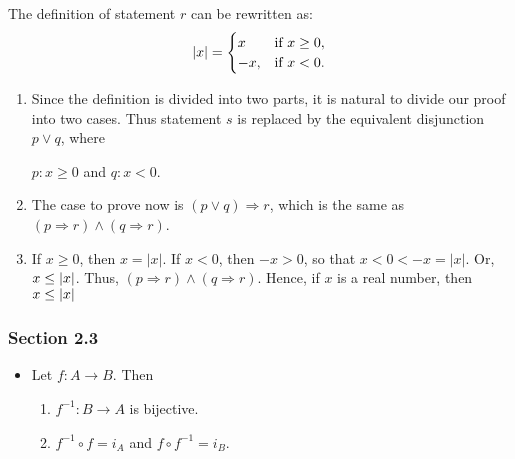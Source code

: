 \documentclass[12pt]{article}
\begin{document}
\begin{itemize}
The definition of statement \(r\) can be rewritten as:
\[\lvert{}x\rvert{}= 
  \begin{cases} 
    x & $if $x\ge{}0,  \\
    -x, & $if $x<0.
  \end{cases} \]

\begin{enumerate}
\item Since the definition is divided into two parts, it is natural to divide our
proof into two cases. Thus statement \(s\) is replaced by the equivalent
disjunction \(p\lor{}q\), where
\begin{center}
\(p: x\ge0\) and \(q: x<0\).
\end{center}

\item The case to prove now is \((p\lor{}q)\Rightarrow{}r\), which is the same as \((p\Rightarrow{}r)\land(q\Rightarrow{}r)\).

\item If \(x\ge0\), then \(x=\lvert{}x\rvert{}\). If \(x<0\), then \(-x>0\), so that
\(x<0<-x=\lvert{}x\rvert{}\). Or, \(x\le\left|x\right|\). Thus, \((p\Rightarrow{}r)\land(q\Rightarrow{}r)\). Hence, if
\(x\) is a real number, then \(x\le\left|x\right|\)
\end{enumerate}
\end{itemize}
\subsubsection{Section 2.3}
\label{sec:orgc030704}
\begin{itemize}
\item Let \(f:A\longrightarrow{}B\). Then
\begin{enumerate}
\item \(f^{-1}:B\longrightarrow{}A\) is bijective.
\item \(f^{-1}\circ{}f=i_{A}\) and \(f\circ{}f^{-1}=i_{B}\).
\end{enumerate}
\end{itemize}
\end{document}
